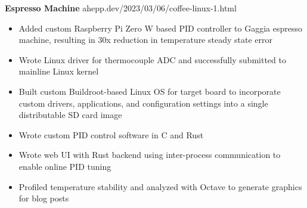 \noindent \textbf{Espresso Machine} \hfill ahepp.dev/2023/03/06/coffee-linux-1.html
\begin{itemize}
    \item Added custom Raspberry Pi Zero W based PID controller to Gaggia espresso machine, resulting in 30x reduction in temperature steady state error
    \item Wrote Linux driver for thermocouple ADC and successfully submitted to mainline Linux kernel
    \item Built custom Buildroot-based Linux OS for target board to incorporate custom drivers, applications, and configuration settings into a single distributable SD card image
    \item Wrote custom PID control software in C and Rust
    \item Wrote web UI with Rust backend using inter-process communication to enable online PID tuning
    \item Profiled temperature stability and analyzed with Octave to generate graphics for blog posts
\end{itemize}
